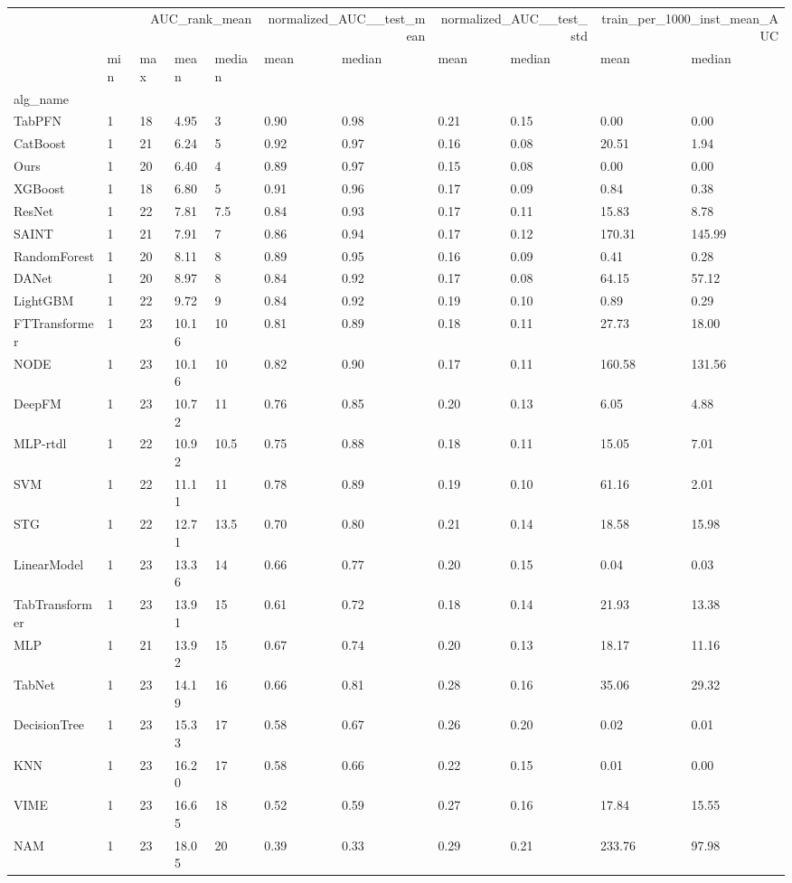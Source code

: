 \begin{tabular}{lllllllllll}
\toprule
 & \multicolumn{4}{r}{AUC_rank_mean} & \multicolumn{2}{r}{normalized_AUC__test_mean} & \multicolumn{2}{r}{normalized_AUC__test_std} & \multicolumn{2}{r}{train_per_1000_inst_mean_AUC} \\
 & min & max & mean & median & mean & median & mean & median & mean & median \\
alg_name &  &  &  &  &  &  &  &  &  &  \\
\midrule
TabPFN & 1 & 18 & 4.95 & 3 & 0.90 & 0.98 & 0.21 & 0.15 & 0.00 & 0.00 \\
CatBoost & 1 & 21 & 6.24 & 5 & 0.92 & 0.97 & 0.16 & 0.08 & 20.51 & 1.94 \\
Ours & 1 & 20 & 6.40 & 4 & 0.89 & 0.97 & 0.15 & 0.08 & 0.00 & 0.00 \\
XGBoost & 1 & 18 & 6.80 & 5 & 0.91 & 0.96 & 0.17 & 0.09 & 0.84 & 0.38 \\
ResNet & 1 & 22 & 7.81 & 7.5 & 0.84 & 0.93 & 0.17 & 0.11 & 15.83 & 8.78 \\
SAINT & 1 & 21 & 7.91 & 7 & 0.86 & 0.94 & 0.17 & 0.12 & 170.31 & 145.99 \\
RandomForest & 1 & 20 & 8.11 & 8 & 0.89 & 0.95 & 0.16 & 0.09 & 0.41 & 0.28 \\
DANet & 1 & 20 & 8.97 & 8 & 0.84 & 0.92 & 0.17 & 0.08 & 64.15 & 57.12 \\
LightGBM & 1 & 22 & 9.72 & 9 & 0.84 & 0.92 & 0.19 & 0.10 & 0.89 & 0.29 \\
FTTransformer & 1 & 23 & 10.16 & 10 & 0.81 & 0.89 & 0.18 & 0.11 & 27.73 & 18.00 \\
NODE & 1 & 23 & 10.16 & 10 & 0.82 & 0.90 & 0.17 & 0.11 & 160.58 & 131.56 \\
DeepFM & 1 & 23 & 10.72 & 11 & 0.76 & 0.85 & 0.20 & 0.13 & 6.05 & 4.88 \\
MLP-rtdl & 1 & 22 & 10.92 & 10.5 & 0.75 & 0.88 & 0.18 & 0.11 & 15.05 & 7.01 \\
SVM & 1 & 22 & 11.11 & 11 & 0.78 & 0.89 & 0.19 & 0.10 & 61.16 & 2.01 \\
STG & 1 & 22 & 12.71 & 13.5 & 0.70 & 0.80 & 0.21 & 0.14 & 18.58 & 15.98 \\
LinearModel & 1 & 23 & 13.36 & 14 & 0.66 & 0.77 & 0.20 & 0.15 & 0.04 & 0.03 \\
TabTransformer & 1 & 23 & 13.91 & 15 & 0.61 & 0.72 & 0.18 & 0.14 & 21.93 & 13.38 \\
MLP & 1 & 21 & 13.92 & 15 & 0.67 & 0.74 & 0.20 & 0.13 & 18.17 & 11.16 \\
TabNet & 1 & 23 & 14.19 & 16 & 0.66 & 0.81 & 0.28 & 0.16 & 35.06 & 29.32 \\
DecisionTree & 1 & 23 & 15.33 & 17 & 0.58 & 0.67 & 0.26 & 0.20 & 0.02 & 0.01 \\
KNN & 1 & 23 & 16.20 & 17 & 0.58 & 0.66 & 0.22 & 0.15 & 0.01 & 0.00 \\
VIME & 1 & 23 & 16.65 & 18 & 0.52 & 0.59 & 0.27 & 0.16 & 17.84 & 15.55 \\
NAM & 1 & 23 & 18.05 & 20 & 0.39 & 0.33 & 0.29 & 0.21 & 233.76 & 97.98 \\
\bottomrule
\end{tabular}
